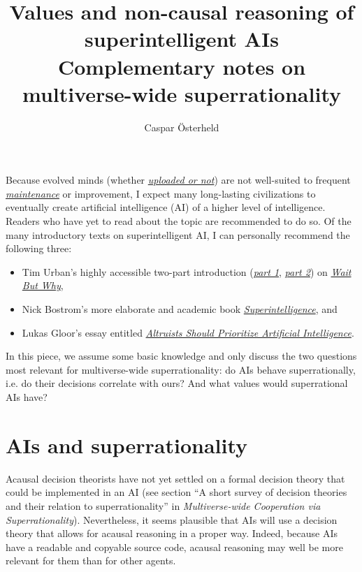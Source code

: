 \documentclass[]{article}
\title{Values and non-causal reasoning of superintelligent AIs \\ \vspace{5mm} \small{Complementary notes on multiverse-wide superrationality}}
\author{Caspar \"Osterheld}
\date{}
\begin{document}
\maketitle

Because evolved minds (whether
\href{https://en.wikipedia.org/wiki/Mind_uploading}{\emph{uploaded or
not}}) are not well-suited to frequent
\href{https://en.wikipedia.org/wiki/Software_maintenance}{\emph{maintenance}}
or improvement, I expect many long-lasting civilizations to eventually
create artificial intelligence (AI) of a higher level of intelligence.
Readers who have yet to read about the topic are recommended to do so.
Of the many introductory texts on superintelligent AI, I can personally
recommend the following three:

\begin{itemize}
\item
  Tim Urban's highly accessible two-part introduction
  (\href{http://waitbutwhy.com/2015/01/artificial-intelligence-revolution-1.html}{\emph{part
  1}},
  \href{http://waitbutwhy.com/2015/01/artificial-intelligence-revolution-2.html}{\emph{part
  2}}) on \href{http://waitbutwhy.com/}{\emph{Wait But Why}},
\item
  Nick Bostrom's more elaborate and academic book
  \href{https://en.wikipedia.org/wiki/Superintelligence:_Paths,_Dangers,_Strategies}{\emph{Superintelligence}},
  and
\item
  Lukas Gloor's essay entitled
  \href{https://foundational-research.org/altruists-should-prioritize-artificial-intelligence/}{\emph{Altruists
  Should Prioritize Artificial Intelligence}}.
\end{itemize}

In this piece, we assume some basic knowledge and only discuss the two
questions most relevant for multiverse-wide superrationality: do AIs
behave superrationally, i.e. do their decisions correlate with ours? And
what values would superrational AIs have?

\section{AIs and superrationality}\label{ais-and-superrationality}

Acausal decision theorists have not yet settled on a formal decision
theory that could be implemented in an AI (see section ``A short survey
of decision theories and their relation to superrationality'' in
\emph{Multiverse-wide Cooperation via Superrationality}).
Nevertheless, it seems plausible that AIs will use a decision
theory that allows for acausal reasoning in a proper way. Indeed,
because AIs have a readable and copyable source code, acausal reasoning
may well be more relevant for them than for other agents.
\end{document}
